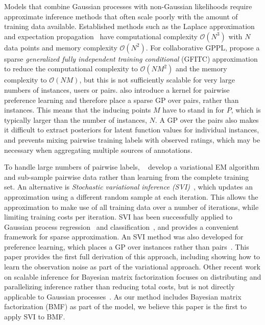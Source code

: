 Models that combine Gaussian processes with non-Gaussian likelihoods 
require approximate inference methods that often scale poorly with 
the amount of training data available. 
Established methods such as the Laplace approximation 
and expectation propagation~\citep{rasmussen_gaussian_2006} have
computational complexity $\mathcal{O}(N^3)$ with $N$ data points
 and memory complexity $\mathcal{O}(N^2)$. 
For collaborative GPPL, \citet{houlsby2012collaborative}
propose a sparse
\emph{generalized fully independent training conditional} (GFITC) 
approximation~\citep{snelson2006sparse} to reduce the computational complexity to $\mathcal{O}(NM^2)$
and the memory complexity to $\mathcal{O}(NM)$, but this is not sufficiently scalable
 for very large numbers of instances, users or pairs.
\citet{houlsby2012collaborative} also introduce a kernel for pairwise 
preference learning and therefore place a sparse GP over pairs, rather than instances. This
means that the inducing points $M$ have to stand in for $P$, which is typically larger than the number of 
instances, $N$. 
A GP over the pairs also makes it difficult to extract posteriors for latent function values for individual instances,
and prevents mixing pairwise training labels
with observed ratings, which may be necessary when aggregating multiple sources of annotations.

To handle large numbers of pairwise labels, ~\citet{khan2014scalable}
develop a variational EM algorithm and sub-sample pairwise data rather than learning from the complete training set.
An alternative is \emph{Stochastic variational inference (SVI)}~\citep{hoffman2013stochastic}, which updates an approximation using 
 a different random sample at each iteration. 
 This allows the approximation to make use of all training data over a number of 
 iterations, while limiting training costs per iteration.
SVI has been successfully applied to Gaussian process regression~\citep{hensman2013gaussian} and classification~\citep{hensman2015scalable},
and provides a convenient framework for sparse approximation.
 An SVI method was also developed for preference learning,
 which places a GP over instances rather than pairs~\citep{simpson2018finding}.
This paper provides the first full derivation of this approach, including showing how to learn the observation noise
as part of the variational approach. 
 Other recent work on scalable inference for Bayesian matrix factorization focuses on distributing and parallelizing 
 inference rather than reducing total costs, but is not directly applicable to Gaussian processes~\citep{ahn2015large,vander2017distributed,chen2018large}. 
As our method includes Bayesian matrix factorization (BMF) as part of the model, 
we believe this paper is the first to apply SVI to BMF.

